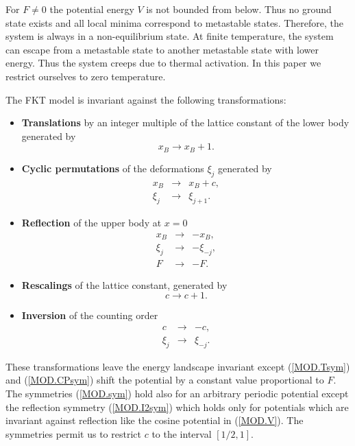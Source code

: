 For $F\not=0$ the potential energy $V$ is not bounded from below.
Thus no ground state exists and all local minima correspond to
metastable states. Therefore, the system is always in a
non-equilibrium state.  At finite temperature, the system can escape
from a metastable state to another metastable state with lower
energy. Thus the system creeps due to thermal
activation\cite{hes.94}. In this paper we restrict ourselves to zero
temperature.

The FKT model is invariant against the following transformations:
\begin{mathletters}
\label{MOD.sym}
\begin{itemize}
\item {\bf Translations} by an integer multiple of the lattice
constant of the lower body generated by
\begin{equation}
  x_B\to x_B+1.
  \label{MOD.Tsym}
\end{equation}
\item {\bf Cyclic permutations} of the deformations $\xi_j$ generated
by
\begin{equation}\begin{array}{rcl}
   x_B&\to &x_B+c,\\
   \xi_j&\to &\xi_{j+1}.
   \end{array}\label{MOD.CPsym}
\end{equation}
\item {\bf Reflection} of the upper body at $x=0$ 
\begin{equation}\begin{array}{rcl}
   x_B&\to &-x_B,\\
   \xi_j&\to &-\xi_{-j},\\
   F&\to &-F.
   \end{array}\label{MOD.I2sym}
\end{equation}
\item {\bf Rescalings} of the lattice constant, generated by
\begin{equation}
  c\to c+1.
  \label{MOD.Ssym}
\end{equation}
\item {\bf Inversion} of the counting order
\begin{equation}\begin{array}{rcl}
   c&\to &-c,\\\xi_j&\to &\xi_{-j}.
   \end{array}\label{MOD.I1sym}
\end{equation}
\end{itemize}
\end{mathletters}
These transformations leave the energy landscape invariant except 
(\ref{MOD.Tsym}) and (\ref{MOD.CPsym}) shift the potential by a 
constant value proportional to $F$. The symmetries (\ref{MOD.sym}) 
hold also for an arbitrary periodic potential except the reflection
symmetry (\ref{MOD.I2sym}) which holds only for potentials which are
invariant against reflection like the cosine potential in
(\ref{MOD.V}). The symmetries permit us to restrict $c$ to the
interval $[1/2,1]$.

